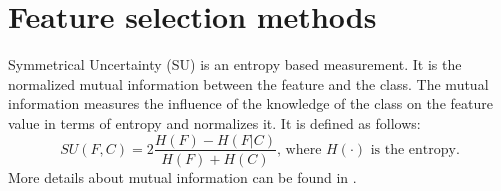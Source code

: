 \documentclass[twoside,11pt]{article}
\begin{document}
\section{Feature selection methods}

Symmetrical Uncertainty (SU) \citep{press1996numerical} is an entropy based measurement. It is the normalized mutual information between the feature and the class. The mutual information measures the influence of the knowledge of the class on the feature value in terms of entropy and normalizes it. It is defined as follows:
\begin{equation}
  \label{eq:su}
  SU(F,C) = 2 \frac{H(F) - H(F|C)}{H(F) + H(C)} \textrm{, where } H(\cdot) \textrm{ is the entropy.}
\end{equation}
More details about mutual information can be found in \cite{paninski2003estimation}. 
\end{document}
